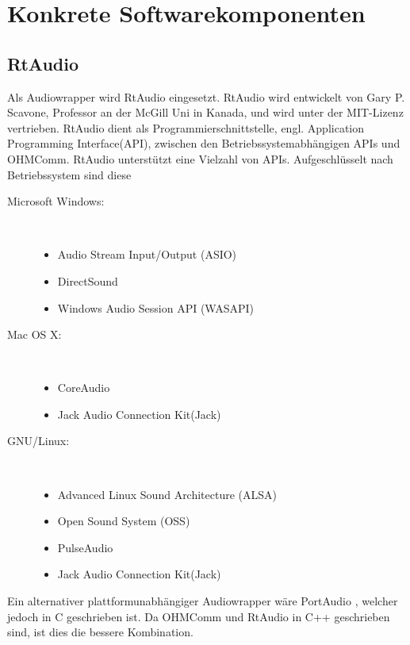 \FloatBarrier

\section{Konkrete Softwarekomponenten}
\subsection{RtAudio}
\label{sec:RtAudio}
Als Audiowrapper wird RtAudio \cite{RtAudio} eingesetzt. RtAudio wird entwickelt von Gary P. Scavone, Professor an der McGill Uni in Kanada, und wird unter der MIT-Lizenz  vertrieben. RtAudio dient als Programmierschnittstelle, engl. Application Programming Interface(API), zwischen den Betriebssystemabhängigen APIs und OHMComm. RtAudio unterstützt eine Vielzahl von APIs. Aufgeschlüsselt nach Betriebssystem sind diese \cite{RTAudioAPIs}

\begin{description}
\item[Microsoft Windows:]~\par
\begin{itemize}
\item Audio Stream Input/Output (ASIO)
\item DirectSound
\item Windows Audio Session API (WASAPI)
\end{itemize}
\item[Mac OS X:]~\par
\begin{itemize}
\item CoreAudio
\item Jack Audio Connection Kit(Jack)
\end{itemize}
\item[GNU/Linux:]~\par
\begin{itemize}
\item Advanced Linux Sound Architecture (ALSA)
\item Open Sound System (OSS)
\item PulseAudio
\item Jack Audio Connection Kit(Jack)
\end{itemize} 
\end{description}

Ein alternativer plattformunabhängiger Audiowrapper wäre PortAudio \cite{Portaudio}, welcher jedoch in C geschrieben ist. Da OHMComm und RtAudio in C++ geschrieben sind, ist dies die bessere Kombination.

